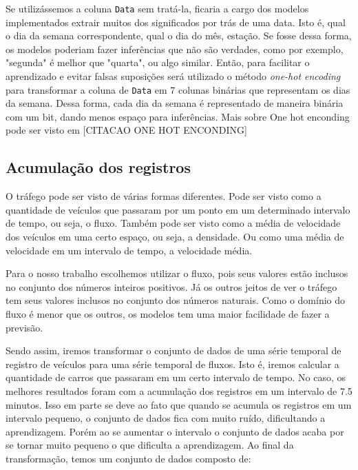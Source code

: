 Se utilizássemos a coluna \texttt{Data} sem tratá-la, ficaria a cargo dos modelos implementados extrair muitos dos significados por trás de uma data. Isto é, qual o dia da semana correspondente, qual o dia do mês, estação. Se fosse dessa forma, os modelos poderiam fazer inferências que não são verdades, como por exemplo, "segunda" é melhor que "quarta", ou algo similar. Então, para facilitar o aprendizado e evitar falsas suposições será utilizado o método \textit{one-hot encoding} para transformar a coluna de \texttt{Data} em 7 colunas binárias que representam os dias da semana. Dessa forma, cada dia da semana é representado de maneira binária com um bit, dando menos espaço para inferências. Mais sobre One hot enconding pode ser visto em [CITACAO ONE HOT ENCONDING]

\subsection{Acumulação dos registros}

O tráfego pode ser visto de várias formas diferentes. Pode ser visto como a quantidade de veículos que passaram por um ponto em um determinado intervalo de tempo, ou seja, o fluxo. Também pode ser visto como a média de velocidade dos veículos em uma certo espaço, ou seja, a densidade. Ou como uma média de velocidade em um intervalo de tempo, a velocidade média.

Para o nosso trabalho escolhemos utilizar o fluxo, pois seus valores estão inclusos no conjunto dos números inteiros positivos. Já os outros jeitos de ver o tráfego tem seus valores inclusos no conjunto dos números naturais. Como o domínio do fluxo é menor que os outros, os modelos tem uma maior facilidade de fazer a previsão.

Sendo assim, iremos transformar o conjunto de dados de uma série temporal de registro de veículos para uma série temporal de fluxos. Isto é, iremos calcular a quantidade de carros que passaram em um certo intervalo de tempo. No caso, os melhores resultados foram com a acumulação dos registros em um intervalo de 7.5 minutos. Isso em parte se deve ao fato que quando se acumula os registros em um intervalo pequeno, o conjunto de dados fica com muito ruído, dificultando a aprendizagem. Porém ao se aumentar o intervalo o conjunto de dados acaba por se tornar muito pequeno o que dificulta a aprendizagem. Ao final da transformação, temos um conjunto de dados composto de:

